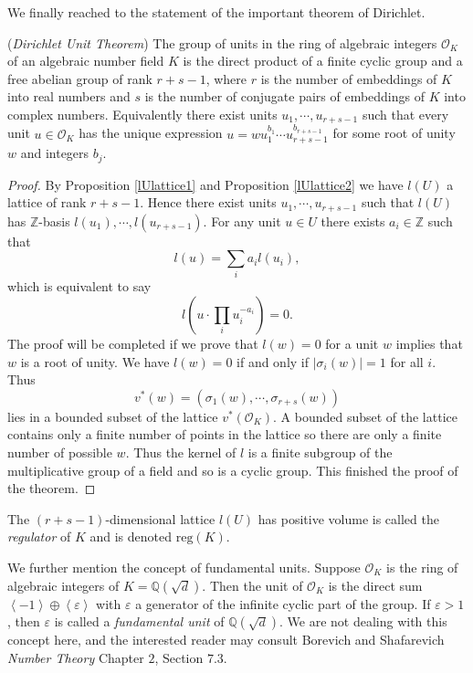 We finally reached to the statement of the important theorem of Dirichlet.
\begin{theorem}(\textit{Dirichlet Unit Theorem})
The group of units in the ring of algebraic integers $\mathcal{O}_K$ of an algebraic number field $K$ is the direct product of a finite cyclic group and a free abelian group of rank $r+s-1$, where $r$ is the number of embeddings of $K$ into real numbers and $s$ is the number of conjugate pairs of embeddings of $K$ into complex numbers. Equivalently there exist units $u_1,\cdots,u_{r+s-1}$ such that every unit $u\in\mathcal{O}_K$ has the unique expression $u=wu_{1}^{b_1}\cdots u_{r+s-1}^{b_{r+s-1}}$ for some root of unity $w$ and integers $b_j$.
\end{theorem}
\begin{proof}
By Proposition \ref{lUlattice1} and Proposition \ref{lUlattice2} we have $l(U)$ a lattice of rank $r+s-1$. Hence there exist units $u_1,\cdots,u_{r+s-1}$ such that $l(U)$ has $\mathbb{Z}$-basis $l(u_1),\cdots,l(u_{r+s-1})$. For any unit $u\in U$ there exists $a_i\in\mathbb{Z}$ such that 
$$
l(u)=\sum_ia_il(u_i),
$$
which is equivalent to say 
$$
l\left( u\cdot \prod_i{u_{i}^{-a_i}} \right) =0.
$$
The proof will be completed if we prove that $l(w)=0$ for a unit $w$ implies that $w$ is a root of unity. We have $l(w)=0$ if and only if $|\sigma_i(w)|=1$ for all $i$. Thus 
$$
v^*\left( w \right) =\left( \sigma _1\left( w \right) ,\cdots ,\sigma _{r+s}\left( w \right) \right) 
$$
lies in a bounded subset of the lattice $v^*(\mathcal{O}_K)$. A bounded subset of the lattice contains only a finite number of points in the lattice so there are only a finite number of possible $w$. Thus the kernel of $l$ is a finite subgroup of the multiplicative group of a field and so is a cyclic group. This finished the proof of the theorem.
\end{proof}
The $(r+s-1)$-dimensional lattice $l(U)$ has positive volume is called the \textit{regulator} of $K$ and is denoted $\mathrm{reg}(K)$.\par
We further mention the concept of fundamental units. Suppose $\mathcal{O}_K$ is the ring of algebraic integers of $K=\mathbb{Q}(\sqrt{d})$. Then the unit of $\mathcal{O}_K$ is the direct sum $\left<-1\right>\oplus\left<\varepsilon\right>$ with $\varepsilon$ a generator of the infinite cyclic part of the group. If $\varepsilon>1$, then $\varepsilon$ is called a \textit{fundamental unit} of $\mathbb{Q}(\sqrt{d})$. We are not dealing with this concept here, and the interested reader may consult Borevich and Shafarevich \textit{Number Theory} Chapter $2$, Section $7.3$.